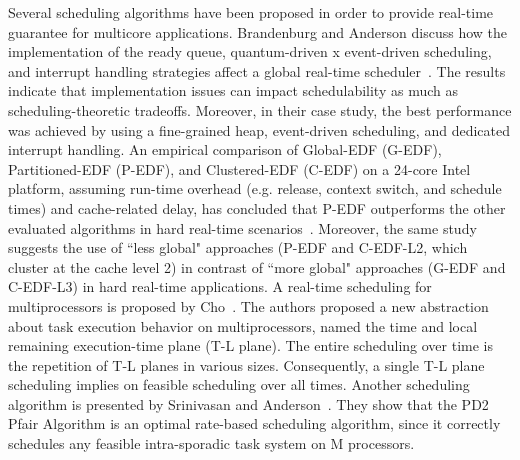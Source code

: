 \documentclass[conference]{IEEEtran}
\begin{document}
Several scheduling algorithms have been proposed in order to provide real-time guarantee for multicore applications. Brandenburg and Anderson discuss how the implementation of the ready queue, quantum-driven x event-driven scheduling, and interrupt handling strategies affect a global real-time scheduler~\cite{Anderson2009b}. The results indicate that implementation issues can impact schedulability as much as scheduling-theoretic tradeoffs. Moreover, in their case study, the best performance was achieved by using a fine-grained heap, event-driven scheduling, and dedicated interrupt handling. An empirical comparison of Global-EDF (G-EDF), Partitioned-EDF (P-EDF), and Clustered-EDF (C-EDF) on a 24-core Intel platform, assuming run-time overhead (e.g. release, context switch, and schedule times) and cache-related delay, has concluded that P-EDF outperforms the other evaluated algorithms in hard real-time scenarios~\cite{Brandenburg2010a}. Moreover, the same study suggests the use of ``less global" approaches (P-EDF and C-EDF-L2, which cluster at the cache level 2) in contrast of ``more global" approaches (G-EDF and C-EDF-L3) in hard real-time applications. A real-time scheduling for multiprocessors is proposed by Cho~\cite{Cho2006}. The authors proposed a new abstraction about task execution behavior on multiprocessors, named the time and local remaining execution-time plane (T-L plane). The entire scheduling over time is the repetition of T-L planes in various sizes. Consequently, a single T-L plane scheduling implies on feasible scheduling over all times. Another scheduling algorithm is presented by Srinivasan and Anderson~\cite{Srinivasan2006}. They show that the PD2 Pfair Algorithm is an optimal rate-based scheduling algorithm, since it correctly schedules any feasible intra-sporadic task system on M processors.
\end{document}
